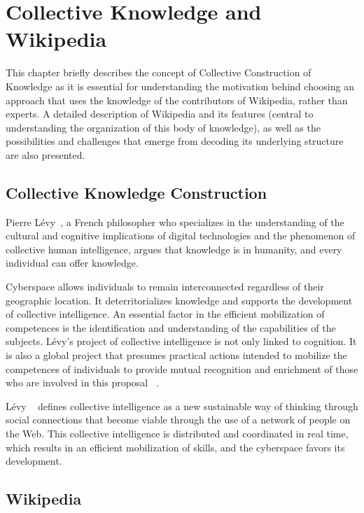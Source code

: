 \chapter{\hspace*{3pt} Collective Knowledge and Wikipedia}
\label{chapter:wikipedia}

This chapter briefly describes the concept of Collective Construction of Knowledge as it is essential for understanding the motivation behind choosing an approach that uses the knowledge of the contributors of Wikipedia, rather than experts. A detailed description of Wikipedia and its features (central to understanding the organization of this body of knowledge), as well as the possibilities and challenges that emerge from decoding its underlying structure are also presented. 

\section{\hspace*{3pt} Collective Knowledge Construction}

Pierre Lévy~\cite{levy1997collective}, a French philosopher who specializes in the understanding of the cultural and cognitive implications of digital technologies and the phenomenon of collective human intelligence, argues that knowledge is in humanity, and every individual can offer knowledge.

Cyberspace allows individuals to remain interconnected regardless of their geographic location. It deterritorializes knowledge and supports the development of collective intelligence. An essential factor in the efficient mobilization of competences is the identification and understanding of the capabilities of the subjects.
Lévy's project of collective intelligence is not only linked to cognition.  It is also a global project that presumes practical actions intended to mobilize the competences of individuals to provide mutual recognition and enrichment of those who are involved in this proposal ~\cite{levy1997collective}.

Lévy ~\cite{levy2001cyberculture} defines collective intelligence as a new sustainable way of thinking through social connections that become viable through the use of a network of people on the Web. This collective intelligence is distributed and coordinated in real time, which results in an efficient mobilization of skills, and the cyberspace favors its development.

\section{\hspace*{3pt} Wikipedia}


